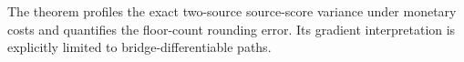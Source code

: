 The theorem profiles the exact two-source source-score variance under monetary costs and quantifies the floor-count rounding error.  Its gradient interpretation is explicitly limited to bridge-differentiable paths.